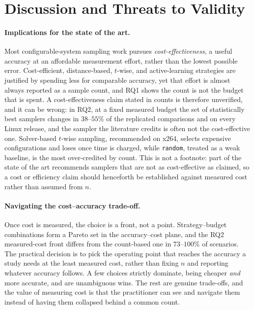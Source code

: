 \section{Discussion and Threats to Validity}
\label{sec:discussion}

\paragraph*{Implications for the state of the art.}
Most configurable-system sampling work pursues \emph{cost-effectiveness}, a useful
accuracy at an affordable measurement effort, rather than the lowest possible
error. Cost-efficient, distance-based, $t$-wise, and active-learning strategies are
justified by spending less for comparable accuracy, yet that effort is almost
always reported as a sample count, and RQ1 shows the count is not the budget that
is spent. A cost-effectiveness claim stated in counts is therefore unverified, and
it can be wrong: in RQ2, at a fixed measured budget the set of statistically best
samplers changes in $38$--$55\%$ of the replicated comparisons and on every Linux
release, and the sampler the literature credits is often not the cost-effective
one. Solver-based $t$-wise sampling, recommended on x264, selects expensive
configurations and loses once time is charged, while \texttt{random}, treated as a
weak baseline, is the most over-credited by count. This is not a footnote: part of
the state of the art recommends samplers that are not as cost-effective as claimed,
so a cost or efficiency claim should henceforth be established against measured
cost rather than assumed from $n$.

\paragraph*{Navigating the cost--accuracy trade-off.}
Once cost is measured, the choice is a front, not a point. Strategy--budget
combinations form a Pareto set in the accuracy--cost plane, and the RQ2
measured-cost front differs from the count-based one in $73$--$100\%$ of scenarios. The practical
decision is to pick the operating point that reaches the accuracy a study needs at
the least measured cost, rather than fixing $n$ and reporting whatever accuracy
follows. A few choices strictly dominate, being cheaper \emph{and} more accurate,
and are unambiguous wins. The rest are genuine trade-offs, and the value of
measuring cost is that the practitioner can see and navigate them instead of
having them collapsed behind a common count.

